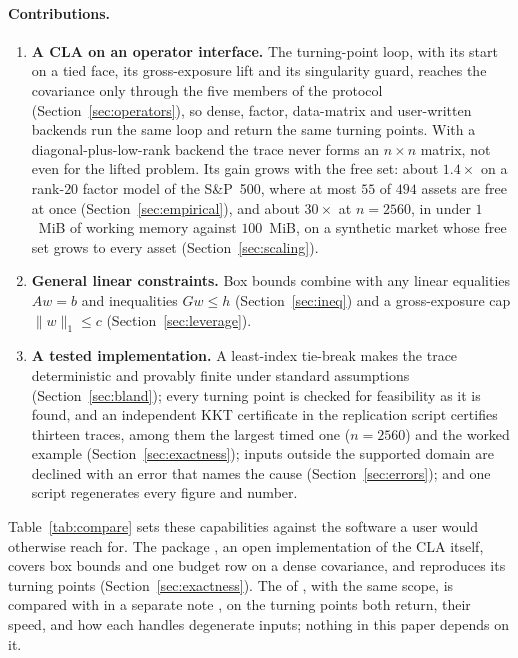 \paragraph{Contributions.}
\begin{enumerate}\setlength{\itemsep}{2pt}
\item \textbf{A CLA on an operator interface.} The turning-point loop, with its start on
a tied face, its gross-exposure lift and its singularity guard, reaches the covariance
only through the five members of the  protocol
(Section~\ref{sec:operators}), so dense, factor, data-matrix and user-written backends
run the same loop and return the same turning points. With a diagonal-plus-low-rank
backend the trace never forms an $n\times n$ matrix, not even for the lifted problem. Its gain grows with the free set: about $1.4\times$
on a rank-$20$ factor model of the S\&P~500, where at most $55$ of $494$ assets are free
at once (Section~\ref{sec:empirical}), and about $30\times$ at $n=2560$, in under $1$~MiB
of working memory against $100$~MiB, on a synthetic market whose free set grows to every
asset (Section~\ref{sec:scaling}).
\item \textbf{General linear constraints.} Box bounds combine with any linear
equalities $A w = b$ and inequalities $G w \le h$ (Section~\ref{sec:ineq}) and a
gross-exposure cap $\lVert w\rVert_1 \le c$ (Section~\ref{sec:leverage}).
\item \textbf{A tested implementation.} A least-index tie-break makes the trace
deterministic and provably finite under standard assumptions (Section~\ref{sec:bland});
every turning point is checked for feasibility as it is found, and an independent KKT
certificate in the replication script certifies thirteen traces, among them the largest
timed one ($n = 2560$) and the worked example (Section~\ref{sec:exactness}); inputs
outside the supported domain are declined with an error that names the cause
(Section~\ref{sec:errors}); and one script regenerates every figure and number.
\end{enumerate}
Table~\ref{tab:compare} sets these capabilities against the software a user would
otherwise reach for. The  package  \citep{rcla}, an open
implementation of the CLA itself, covers box bounds and one budget row on a dense
covariance, and  reproduces its turning points (Section~\ref{sec:exactness}).
The  of  \citep{pyportfolioopt}, with the same scope, is
compared with  in a separate note \citep{schmelzer2026comparison}, on the
turning points both return, their speed, and how each handles degenerate inputs; nothing
in this paper depends on it.

